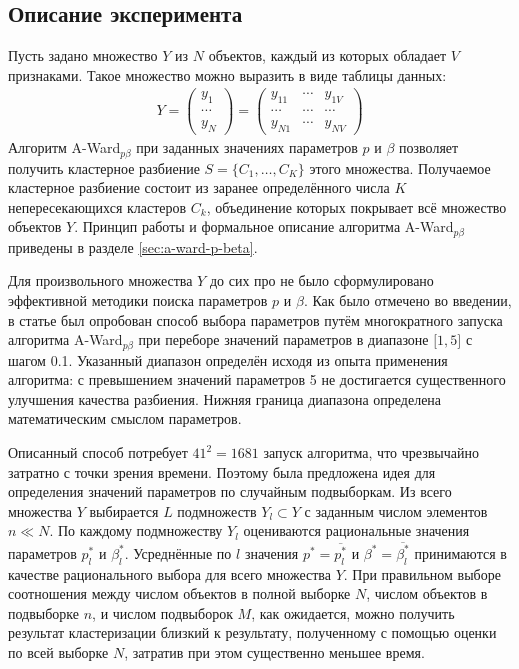 \documentclass[12pt]{a&t}
\begin{document}
\subsection{Описание эксперимента} \label{sec:experiment-description}
Пусть задано множество $ Y $ из $ N $ объектов, каждый из которых обладает $ V $ признаками. Такое множество можно выразить в виде таблицы данных:
\begin{gather} \label{eq:data-table}
	Y= \begin{pmatrix} 
	y_{1} \\
	\cdots \\ 
	y_{N} 
	\end{pmatrix}
	= \begin{pmatrix} 
		y_{11} & \cdots  & y_{1V} \\ 
		\cdots & \cdots  & \cdots \\ 
		y_{N1} & \cdots  & y_{NV} 
	\end{pmatrix}
\end{gather}
Алгоритм \mbox{A-Ward$ _{p\beta} $} при заданных значениях параметров $ p $ и $ \beta $  позволяет получить кластерное разбиение $ S=\{C_1, \ldots, C_K\} $  этого множества. Получаемое кластерное разбиение состоит из заранее определённого числа $ K $ непересекающихся кластеров $ C_k $, объединение которых покрывает всё множество объектов $ Y $. Принцип работы и формальное описание алгоритма \mbox{A-Ward$ _{p\beta} $} приведены в разделе \ref{sec:a-ward-p-beta}.

Для произвольного множества $ Y $ до сих про не было сформулировано эффективной методики поиска параметров  $ p $ и $ \beta $. Как было отмечено во введении, в статье \cite{SW-Based-Search} был опробован способ выбора параметров путём многократного запуска алгоритма \mbox{A-Ward$ _{p\beta} $} при переборе значений параметров в диапазоне $ \lbrack 1,5 \rbrack $ с шагом 0.1. Указанный диапазон определён исходя из опыта применения алгоритма: с превышением значений параметров 5 не достигается существенного улучшения качества разбиения. Нижняя граница диапазона определена математическим смыслом параметров.  

Описанный способ потребует $ 41^2= 1681 $ запуск алгоритма, что чрезвычайно затратно с точки зрения времени. Поэтому была предложена идея для определения значений параметров по случайным подвыборкам. Из всего множества $ Y $ выбирается $ L $ подмножеств $ Y_l \subset Y $ с заданным числом элементов $ n \ll N $. По каждому подмножеству  $ Y_l $ оцениваются рациональные значения параметров $ p^*_l $ и $ \beta^*_l $. Усреднённые по $ l $ значения $ p^* = \overline{p^*_l} $ и $ \beta^* = \overline{\beta^*_l} $ принимаются в качестве рационального выбора для всего множества $ Y $. При правильном выборе соотношения между числом объектов в полной выборке $ N $, числом объектов в подвыборке $ n $, и числом подвыборок $ M $, как ожидается, можно получить результат кластеризации близкий к результату, полученному с помощью оценки по всей выборке $ N $, затратив при этом существенно меньшее время.
\end{document}
